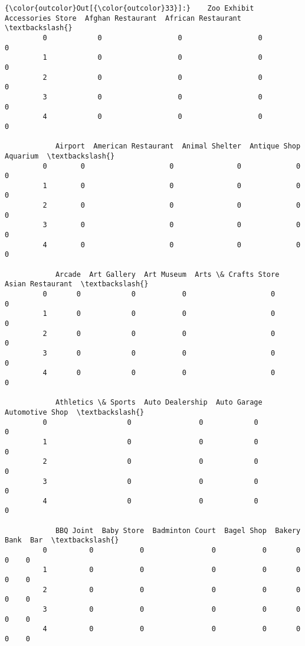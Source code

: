\documentclass[11pt]{article}
\begin{document}
\begin{Verbatim}[commandchars=\\\{\}]
{\color{outcolor}Out[{\color{outcolor}33}]:}    Zoo Exhibit  Accessories Store  Afghan Restaurant  African Restaurant  \textbackslash{}
         0            0                  0                  0                   0   
         1            0                  0                  0                   0   
         2            0                  0                  0                   0   
         3            0                  0                  0                   0   
         4            0                  0                  0                   0   
         
            Airport  American Restaurant  Animal Shelter  Antique Shop  Aquarium  \textbackslash{}
         0        0                    0               0             0         0   
         1        0                    0               0             0         0   
         2        0                    0               0             0         0   
         3        0                    0               0             0         0   
         4        0                    0               0             0         0   
         
            Arcade  Art Gallery  Art Museum  Arts \& Crafts Store  Asian Restaurant  \textbackslash{}
         0       0            0           0                    0                 0   
         1       0            0           0                    0                 0   
         2       0            0           0                    0                 0   
         3       0            0           0                    0                 0   
         4       0            0           0                    0                 0   
         
            Athletics \& Sports  Auto Dealership  Auto Garage  Automotive Shop  \textbackslash{}
         0                   0                0            0                0   
         1                   0                0            0                0   
         2                   0                0            0                0   
         3                   0                0            0                0   
         4                   0                0            0                0   
         
            BBQ Joint  Baby Store  Badminton Court  Bagel Shop  Bakery  Bank  Bar  \textbackslash{}
         0          0           0                0           0       0     0    0   
         1          0           0                0           0       0     0    0   
         2          0           0                0           0       0     0    0   
         3          0           0                0           0       0     0    0   
         4          0           0                0           0       0     0    0   
         

\end{Verbatim}
\end{document}

